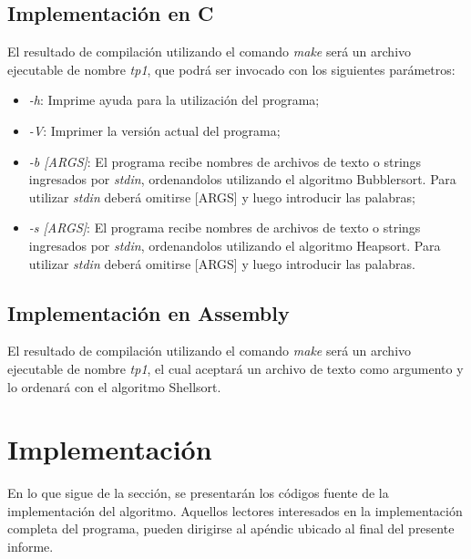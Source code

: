\documentclass{article}
\begin{document}
\subsection{Implementación en C}

	El resultado de compilación utilizando el comando \textit{make} será un archivo ejecutable de nombre \textit{tp1}, que podrá ser invocado con los siguientes parámetros:
	\medskip

	\begin{itemize}

		\itemsep=2pt \topsep=0pt \partopsep=0pt \parskip=0pt \parsep=0pt
			\item \textit{-h}:  Imprime ayuda para la utilización del programa;
			\item \textit{-V}:  Imprimer la versión actual del programa;
			\item \textit{-b [ARGS]}:  El programa recibe nombres de archivos de texto o strings ingresados por \textit{stdin}, ordenandolos utilizando el algoritmo Bubblersort. Para utilizar \textit{stdin} deberá omitirse [ARGS] y luego introducir las palabras;
			\item \textit{-s [ARGS]}:  El programa recibe nombres de archivos de texto o strings ingresados por \textit{stdin}, ordenandolos utilizando el algoritmo Heapsort. Para utilizar \textit{stdin} deberá omitirse [ARGS] y luego introducir las palabras.

	\end{itemize}	
	\medskip



\subsection{Implementación en Assembly}

	El resultado de compilación utilizando el comando \textit{make} será un archivo ejecutable de nombre \textit{tp1}, el cual aceptará un archivo de texto como argumento y lo ordenará con el algoritmo Shellsort.
\medskip




\section{Implementación}
	
	En lo que sigue de la sección, se presentarán los códigos fuente de la implementación del algoritmo. Aquellos lectores interesados en la implementación completa del programa, pueden dirigirse al apéndic ubicado al final del presente informe.
\bigskip
\end{document}
